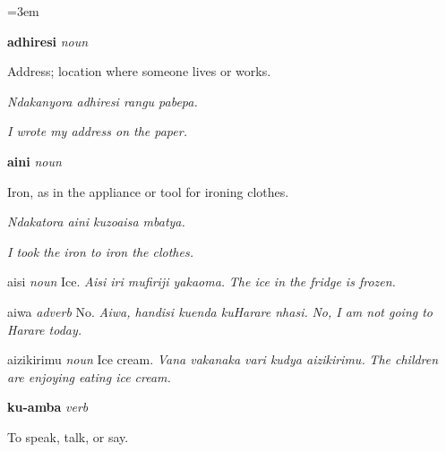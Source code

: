 \documentclass[10pt,twoside]{book}
\newcommand{\headword}[1]{%
    \textbf{\color{headwordcolor}\large #1}%
}
\newcommand{\verbheadword}[2]{%
    \textbf{\large\color{prefixcolor}#1\color{headwordcolor}#2}%
}
\newcommand{\verbpos}{\textit{\color{verbcolor}verb}}
\newcommand{\nounpos}{\textit{\color{nouncolor}noun}}
\newcommand{\partofpeech}[1]{%
    \textit{\color{partofpeechcolor}#1}%
}
\newcommand{\example}[2]{%
    \textit{\color{examplecolor}#1} \textit{#2}%
}
\begin{document}
\begin{multicols}{2}
\raggedright
{}
\emergencystretch=3em

\begin{samepage}
\par\noindent\headword{adhiresi}\space\nounpos

Address; location where someone lives or works.

{\color{examplecolor}\small\textit{Ndakanyora adhiresi rangu pabepa.}}

{\color{englishexamplecolor}\small\textit{I wrote my address on the paper.}}
\end{samepage}

\par\vspace{4pt}

\begin{samepage}
\par\noindent\headword{aini}\space\nounpos

Iron, as in the appliance or tool for ironing clothes.

{\color{examplecolor}\small\textit{Ndakatora aini kuzoaisa mbatya.}}

{\color{englishexamplecolor}\small\textit{I took the iron to iron the clothes.}}
\end{samepage}

\par\vspace{4pt}

\begin{dictentry}{aisi}
\partofpeech{noun} Ice. \example{Aisi iri mufiriji yakaoma.}{The ice in the fridge is frozen.}
\end{dictentry}

\begin{dictentry}{aiwa}
\partofpeech{adverb} No. \example{Aiwa, handisi kuenda kuHarare nhasi.}{No, I am not going to Harare today.}
\end{dictentry}

\begin{dictentry}{aizikirimu}
\partofpeech{noun} Ice cream. \example{Vana vakanaka vari kudya aizikirimu.}{The children are enjoying eating ice cream.}
\end{dictentry}

\begin{samepage}
\par\noindent\verbheadword{ku-}{amba}\space\verbpos

To speak, talk, or say.


\end{samepage}
\end{multicols}
\end{document}
